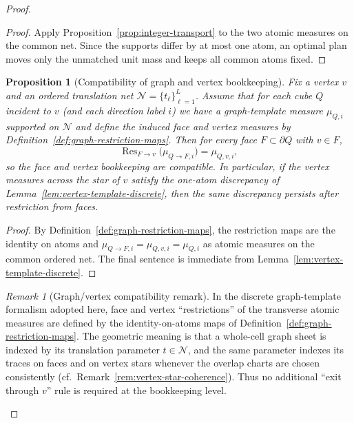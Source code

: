 \documentclass[11pt]{article}
\numberwithin{equation}{section}  %
\theoremstyle{plain}
\newtheorem{proposition}[theorem]{Proposition}
\theoremstyle{definition}
\theoremstyle{remark}
\newtheorem{remark}[theorem]{Remark}
\begin{document}
\begin{proof}
\begin{proof}
Apply Proposition~\ref{prop:integer-transport} to the two atomic measures on the common net. Since the supports differ by at most one atom,
an optimal plan moves only the unmatched unit mass and keeps all common atoms fixed.
\end{proof}


%
\begin{proposition}[Compatibility of graph and vertex bookkeeping]\label{prop:graph-vertex-compatibility}
Fix a vertex $v$ and an ordered translation net $\mathcal N=\{t_\ell\}_{\ell=1}^L$.
Assume that for each cube $Q$ incident to $v$ (and each direction label $i$) we have a graph-template measure
$\mu_{Q,i}$ supported on $\mathcal N$ and define the induced face and vertex measures by
Definition~\ref{def:graph-restriction-maps}.
Then for every face $F\subset\partial Q$ with $v\in F$,
\[
\operatorname{Res}_{F\to v}\bigl(\mu_{Q\to F,i}\bigr)=\mu_{Q,v,i},
\]
so the face and vertex bookkeeping are compatible.
In particular, if the vertex measures across the star of $v$ satisfy the one-atom discrepancy of
Lemma~\ref{lem:vertex-template-discrete}, then the same discrepancy persists after restriction from faces.
\end{proposition}

\begin{proof}
By Definition~\ref{def:graph-restriction-maps}, the restriction maps are the identity on atoms and
$\mu_{Q\to F,i}=\mu_{Q,v,i}=\mu_{Q,i}$ as atomic measures on the common ordered net.
The final sentence is immediate from Lemma~\ref{lem:vertex-template-discrete}.
\end{proof}


%
\begin{remark}[Graph/vertex compatibility remark]\label{rem:graph-vertex-compatibility}
In the discrete graph-template formalism adopted here, face and vertex ``restrictions'' of the transverse atomic measures
are defined by the identity-on-atoms maps of Definition~\ref{def:graph-restriction-maps}.  The geometric meaning is that a whole-cell
graph sheet is indexed by its translation parameter $t\in\mathcal N$, and the same parameter indexes its traces on faces and
on vertex stars whenever the overlap charts are chosen consistently (cf.\ Remark~\ref{rem:vertex-star-coherence}).
Thus no additional ``exit through $v$'' rule is required at the bookkeeping level.
\end{remark}




\end{proof}
\end{document}
